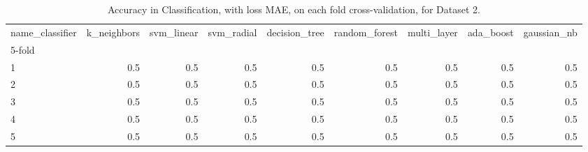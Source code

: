 \begin{table}
\centering
\caption{Accuracy in Classification, with loss MAE, on each fold cross-validation, for Dataset 2.}
\label{table:acc-mae-chbmit-fold-2}
\begin{tabular}{lrrrrrrrr}
\toprule
name\_classifier &  k\_neighbors &  svm\_linear &  svm\_radial &  decision\_tree &  random\_forest &  multi\_layer &  ada\_boost &  gaussian\_nb \\
5-fold &              &             &             &                &                &              &            &              \\
\midrule
1      &          0.5 &         0.5 &         0.5 &            0.5 &            0.5 &          0.5 &        0.5 &          0.5 \\
2      &          0.5 &         0.5 &         0.5 &            0.5 &            0.5 &          0.5 &        0.5 &          0.5 \\
3      &          0.5 &         0.5 &         0.5 &            0.5 &            0.5 &          0.5 &        0.5 &          0.5 \\
4      &          0.5 &         0.5 &         0.5 &            0.5 &            0.5 &          0.5 &        0.5 &          0.5 \\
5      &          0.5 &         0.5 &         0.5 &            0.5 &            0.5 &          0.5 &        0.5 &          0.5 \\
\bottomrule
\end{tabular}
\end{table}
